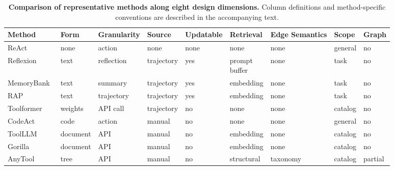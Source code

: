 \begin{table}[htbp]
\centering
\scriptsize
\setlength{\aboverulesep}{0pt}
\setlength{\belowrulesep}{0pt}
\renewcommand{\arraystretch}{1.2} %
\setlength{\tabcolsep}{2.4pt}
\caption{\textbf{Comparison of representative methods along eight design dimensions.} Column definitions and method-specific conventions are described in the accompanying text.}
\label{tab:method-comparison}
\newcommand{\centeredstack}[1]{\ensuremath{\vcenter{\offinterlineskip\vskip1pt\hbox{\shortstack[l]{#1}}\vskip1pt}}}
\begin{tabular}{lllllllll}
\toprule
\rowcolor{GoogleGreen!15}
\textbf{Method} & \textbf{Form} & \textbf{Granularity} & \textbf{Source} & \textbf{Updatable} & \textbf{Retrieval} & \textbf{Edge Semantics} & \textbf{Scope} & \textbf{Graph} \\
\midrule
ReAct~\citep{yao2023react}             & none       & action     & none           & none      & none         & none              & general & no \\
Reflexion~\citep{shinn2023reflexion}   & text       & reflection & trajectory     & yes       & \centeredstack{prompt\\buffer} & none              & task    & no \\
MemoryBank~\citep{zhong2024memorybank} & text       & summary    & trajectory     & yes       & embedding    & none              & task    & no \\
RAP~\citep{kagaya2024rap}              & text       & trajectory & trajectory     & yes       & embedding    & none              & task    & no \\
Toolformer~\citep{schick2023toolformer}& weights    & API call   & trajectory     & no        & none         & none              & catalog & no \\
CodeAct~\citep{wang2024executable}          & code       & action     & manual         & no        & none         & none              & general & no \\
ToolLLM~\citep{qin2024toolllm}         & document   & API        & manual         & no        & embedding    & none              & catalog & no \\
Gorilla~\citep{patil2024gorilla}       & document   & API        & manual         & no        & embedding    & none              & catalog & no \\
AnyTool~\citep{du2024anytool}          & tree       & API        & manual         & no        & structural   & taxonomy          & catalog & partial \\

\end{tabular}
\end{table}
